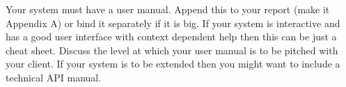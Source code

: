 Your system must have a user manual. Append this to your report (make
it Appendix A) or bind it separately if it is big. If your system is
interactive and has a good user interface with context dependent help
then this can be just a cheat sheet. Discuss the level at which your
user manual is to be pitched with your client. If your system is to be
extended then you might want to include a technical API manual.

